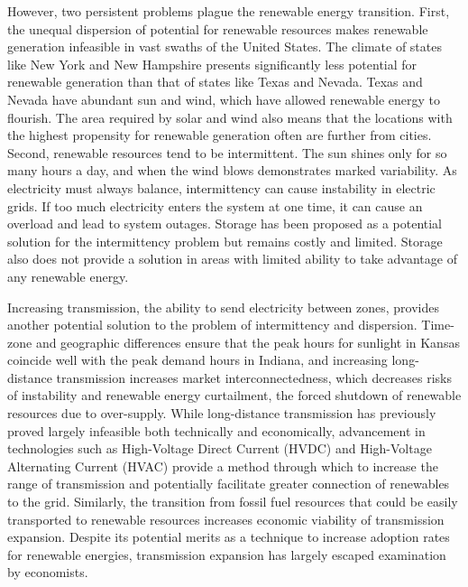 \documentclass[12pt]{article}
\begin{document}
However, two persistent problems plague the renewable energy transition. First, the unequal dispersion of potential for renewable resources makes renewable generation infeasible in vast swaths of the United States. The climate of states like New York and New Hampshire presents significantly less potential for renewable generation than that of states like Texas and Nevada. Texas and Nevada have abundant sun and wind, which have allowed renewable energy to flourish. The area required by solar and wind also means that the locations with the highest propensity for renewable generation often are further from cities. Second, renewable resources tend to be intermittent. The sun shines only for so many hours a day, and when the wind blows demonstrates marked variability. As electricity must always balance, intermittency can cause instability in electric grids. If too much electricity enters the system at one time, it can cause an overload and lead to system outages. Storage has been proposed as a potential solution for the intermittency problem but remains costly and limited. Storage also does not provide a solution in areas with limited ability to take advantage of any renewable energy.

Increasing transmission, the ability to send electricity between zones, provides another potential solution to the problem of intermittency and dispersion. Time-zone and geographic differences ensure that the peak hours for sunlight in Kansas coincide well with the peak demand hours in Indiana, and increasing long-distance transmission increases market interconnectedness, which decreases risks of instability and renewable energy curtailment, the forced shutdown of renewable resources due to over-supply. While long-distance transmission has previously proved largely infeasible both technically and economically, advancement in technologies such as High-Voltage Direct Current (HVDC) and High-Voltage Alternating Current (HVAC) provide a method through which to increase the range of transmission and potentially facilitate greater connection of renewables to the grid. Similarly, the transition from fossil fuel resources that could be easily transported to renewable resources increases economic viability of transmission expansion. Despite its potential merits as a technique to increase adoption rates for renewable energies, transmission expansion has largely escaped examination by economists.
\end{document}
